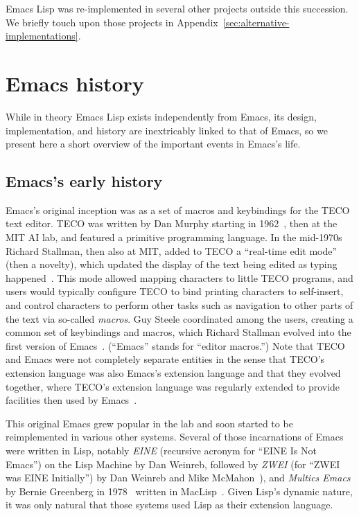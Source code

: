 \documentclass[format=acmsmall, review]{acmart}
\newcommand \Elisp {Emacs Lisp}
\begin{document}
\Elisp{} was re-implemented in several other projects outside this
succession.  We briefly touch upon those projects in
Appendix~\ref{sec:alternative-implementations}.  

\section{Emacs history}
\label{sec:emacs-history}

While in theory \Elisp{} exists independently from Emacs, its design,
implementation, and history are inextricably linked to that of Emacs, so we
present here a short overview of the important events in Emacs's life.

\subsection{Emacs's early history}
\label{sec:emacs-early-history}

Emacs's original inception was as a set of macros and keybindings for the
TECO text editor.  TECO was written by Dan Murphy starting in
1962~\cite{Murphy09}, then at the MIT AI lab, and featured a primitive
programming language.  In the mid-1970s Richard
Stallman, then also at MIT, added to TECO a ``real-time edit mode'' (then
a novelty), which updated the display of the text being edited as typing
happened~\cite{MulticsEmacs1996}.  This mode allowed mapping characters to little TECO programs, and
users would typically configure TECO to bind printing characters to
self-insert, and control characters to perform other tasks such as
navigation to other parts of the text via so-called \textit{macros}.  Guy Steele
coordinated among the users, creating a common set of keybindings and macros, which
Richard Stallman evolved into the first version of
Emacs~\cite{EmacsLore,Seibel2009}.  (``Emacs'' stands for ``editor macros.'')
Note that TECO and Emacs were not completely separate entities in the sense
that TECO's extension language was also Emacs's extension language and that
they evolved together, where TECO's extension language was regularly
extended to provide facilities then used by Emacs~\cite{Stallman2002}.

This original Emacs grew popular in the lab and soon started to be
reimplemented in various other systems.  Several of those incarnations of
Emacs were written in Lisp, notably \emph{EINE} (recursive acronym for
``EINE Is Not Emacs'') on the Lisp Machine by Dan Weinreb, followed by
\emph{ZWEI} (for ``ZWEI was EINE Initially'') by Dan Weinreb and Mike
McMahon~\cite{Weinreb1979}), and \emph{Multics Emacs} by Bernie Greenberg in
1978~\cite{MulticsEmacs1996,Stallman2002} written in MacLisp~\cite{Moon1974,Pitman1983}.
Given Lisp's dynamic nature, it was only natural that those systems used
Lisp as their extension language.
\end{document}
